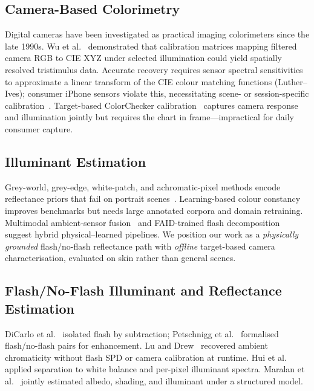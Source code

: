 \documentclass[11pt]{article}
\begin{document}
\subsection{Camera-Based Colorimetry}

Digital cameras have been investigated as practical imaging colorimeters since the late 1990s.
Wu et al.~\cite{wu1999} demonstrated that calibration matrices mapping filtered camera RGB to CIE XYZ under selected illumination could yield spatially resolved tristimulus data.
Accurate recovery requires sensor spectral sensitivities to approximate a linear transform of the CIE colour matching functions (Luther--Ives); consumer iPhone sensors violate this, necessitating scene- or session-specific calibration~\cite{hubel1994comparison,wang2021optimized}.
Target-based ColorChecker calibration~\cite{wakholi2026systematic,BabelColorMCC} captures camera response and illumination jointly but requires the chart in frame---impractical for daily consumer capture.

\subsection{Illuminant Estimation}

Grey-world, grey-edge, white-patch, and achromatic-pixel methods encode reflectance priors that fail on portrait scenes~\cite{gijsenij2011}.
Learning-based colour constancy~\cite{xie2023camera,kang2026graph,liu2026illuminant} improves benchmarks but needs large annotated corpora and domain retraining.
Multimodal ambient-sensor fusion~\cite{liu2026illuminant} and FAID-trained flash decomposition~\cite{flashambient,upadhyay2025low} suggest hybrid physical--learned pipelines.
We position our work as a \emph{physically grounded} flash/no-flash reflectance path with \emph{offline} target-based camera characterisation, evaluated on skin rather than general scenes.

\subsection{Flash/No-Flash Illuminant and Reflectance Estimation}

DiCarlo et al.~\cite{dicarlo2001illuminating} isolated flash by subtraction; Petschnigg et al.~\cite{petschnigg2004digital} formalised flash/no-flash pairs for enhancement.
Lu and Drew~\cite{lu2006practical} recovered ambient chromaticity without flash SPD or camera calibration at runtime.
Hui et al.~\cite{hui2016white,hui2018illuminant} applied separation to white balance and per-pixel illuminant spectra.
Maralan et al.~\cite{maralan2023computational} jointly estimated albedo, shading, and illuminant under a structured model.
\end{document}
